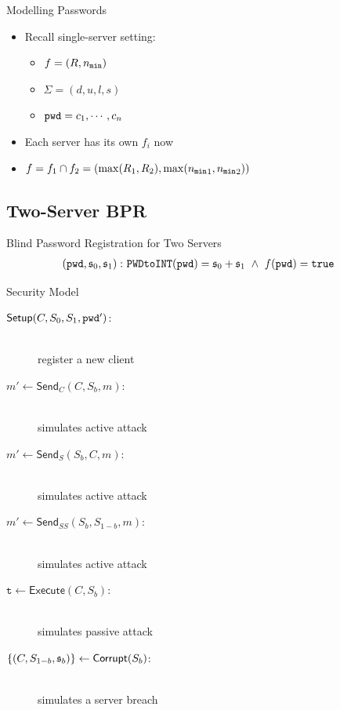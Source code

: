 \documentclass[notes,xcolor=dvipsnames]{beamer}
\begin{document}
\begin{frame}{Modelling Passwords}
  \begin{itemize}
    \item Recall single-server setting:
    \begin{itemize}
      \item $f=(R,{n_\mathtt{min}})$
      \item $\Sigma=(d,u,l,s)$
      \item $\mathtt{pwd}=c_1,\cdots,c_n$
    \end{itemize}
  \end{itemize}
  \vspace*{1em}
  \begin{itemize}
    \item Each server has its own $f_i$ now
    \item $f=f_1\cap f_2=(\max(R_1, R_2), \max({n_\mathtt{min}}_1, {n_\mathtt{min}}_2))$
  \end{itemize}
\end{frame}


\subsection{Two-Server BPR}

\begin{frame}{Blind Password Registration for Two Servers}
  \begin{align*}
    (\mathtt{pwd}, \mathfrak{s}_0, \mathfrak{s}_1):~ &\texttt{PWDtoINT}(\mathtt{pwd})=\mathfrak{s}_0 + \mathfrak{s}_1 ~ \wedge ~ f(\mathtt{pwd})=\mathtt{true}
  \end{align*}
\end{frame}

\begin{frame}{Security Model}
    \begin{description}
      \item[$\mathsf{Setup}(C,S_{0},S_1,\mathtt{pwd}')$:] \hfill \\ register a new client
      \item[$m'\gets\mathsf{Send}_C(C,S_{b},m)$:] \hfill \\ simulates active attack
      \item[$m'\gets\mathsf{Send}_S(S_b,C,m)$:] \hfill \\ simulates active attack
      \item[$m'\gets\mathsf{Send}_{SS}(S_b,S_{1-b},m)$:] \hfill \\ simulates active attack
      \item[$\mathtt{t}\gets\mathsf{Execute}(C,S_b)$:] \hfill \\ simulates passive attack
      \item[$\{(C,S_{1-b},\mathfrak{s}_b)\}\gets\mathsf{Corrupt}(S_b)$:] \hfill \\ simulates a server breach
    \end{description}
\end{frame}
\end{document}
